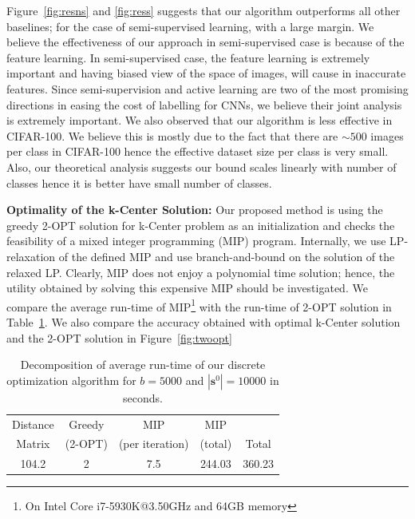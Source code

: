 \documentclass{article}
\begin{document}
Figure~\ref{fig:resns} and \ref{fig:ress} suggests that our algorithm outperforms all other baselines; for the case of semi-supervised learning, with a large margin. We believe the effectiveness of our approach in semi-supervised case is because of the feature learning. In semi-supervised case, the feature learning is extremely important and having biased view of the space of images, will cause in inaccurate features. Since semi-supervision and active learning are two of the most promising directions in easing the cost of labelling for CNNs, we believe their joint analysis is extremely important. We also observed that our algorithm is less effective in CIFAR-100. We believe this is mostly due to the fact that there are $\sim500$ images per class in CIFAR-100 hence the effective dataset size per class is very small. Also, our theoretical analysis suggests our bound scales linearly with number of classes hence it is better have small number of classes.



\noindent\textbf{Optimality of the k-Center Solution:} Our proposed method is using the greedy 2-OPT solution for k-Center problem as an initialization and checks the feasibility of a mixed integer programming (MIP) program. Internally, we use LP-relaxation of the defined MIP and use branch-and-bound on the solution of the relaxed LP. Clearly, MIP does not enjoy a polynomial time solution; hence, the utility obtained by solving this expensive MIP should be investigated. We compare the average run-time of MIP\footnote{On Intel Core i7-5930K@3.50GHz and 64GB memory} with the run-time of 2-OPT solution in Table~\ref{tab:runtime}. We also compare the accuracy obtained with optimal k-Center solution and the 2-OPT solution in Figure~\ref{fig:twoopt}



\begin{table}[ht]
\centering
\vspace{-3mm}
\caption{Decomposition of average run-time of our discrete optimization algorithm for $b=5000$ and $|\mathbf{s}^0|=10000$ in seconds.}
\begin{tabular}{ccccc} \toprule
 Distance& Greedy & MIP & MIP &  \\
Matrix &(2-OPT) & (per iteration) & (total) & Total \\ \midrule
104.2  & 2   & 7.5  &  244.03  & 360.23  \\ \bottomrule
\end{tabular}
\label{tab:runtime}
\vspace{-2mm}
\end{table}
\end{document}
